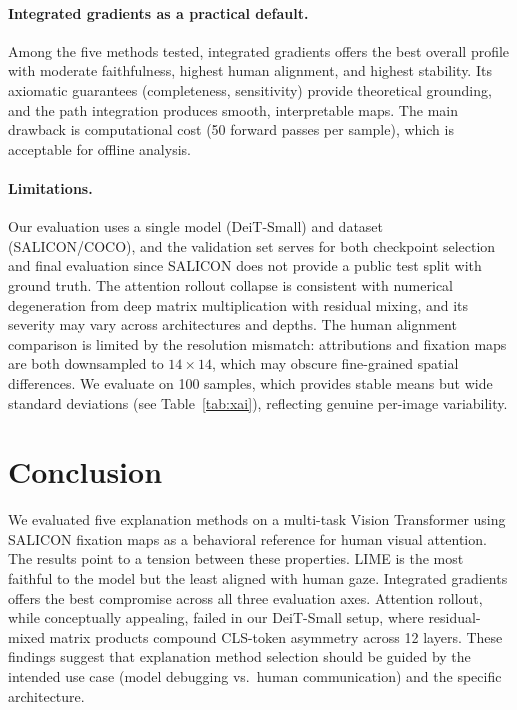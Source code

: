 \documentclass{article}
\begin{document}
\paragraph{Integrated gradients as a practical default.}
Among the five methods tested, integrated gradients offers the best overall profile with moderate faithfulness, highest human alignment, and highest stability. Its axiomatic guarantees (completeness, sensitivity) provide theoretical grounding, and the path integration produces smooth, interpretable maps. The main drawback is computational cost (50 forward passes per sample), which is acceptable for offline analysis.

\paragraph{Limitations.}
Our evaluation uses a single model (DeiT-Small) and dataset (SALICON/COCO), and the validation set serves for both checkpoint selection and final evaluation since SALICON does not provide a public test split with ground truth. The attention rollout collapse is consistent with numerical degeneration from deep matrix multiplication with residual mixing, and its severity may vary across architectures and depths. The human alignment comparison is limited by the resolution mismatch: attributions and fixation maps are both downsampled to $14\!\times\!14$, which may obscure fine-grained spatial differences. We evaluate on 100 samples, which provides stable means but wide standard deviations (see Table~\ref{tab:xai}), reflecting genuine per-image variability.

\section{Conclusion}

We evaluated five explanation methods on a multi-task Vision Transformer using SALICON fixation maps as a behavioral reference for human visual attention. The results point to a tension between these properties. LIME is the most faithful to the model but the least aligned with human gaze. Integrated gradients offers the best compromise across all three evaluation axes. Attention rollout, while conceptually appealing, failed in our DeiT-Small setup, where residual-mixed matrix products compound CLS-token asymmetry across 12 layers. These findings suggest that explanation method selection should be guided by the intended use case (model debugging vs.\ human communication) and the specific architecture.
\end{document}
